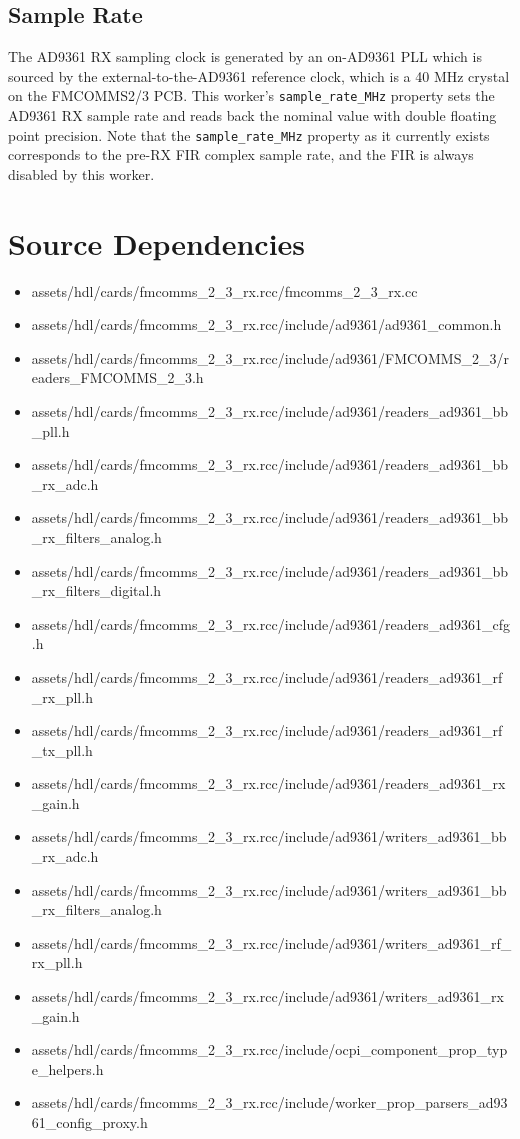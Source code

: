 \documentclass{article}
\begin{document}
\subsection*{Sample Rate}
The AD9361 RX sampling clock is generated by an on-AD9361 PLL which is sourced by the external-to-the-AD9361 reference clock, which is a 40 MHz crystal on the FMCOMMS2/3 PCB. This worker's \verb+sample_rate_MHz+ property sets the AD9361 RX sample rate and reads back the nominal value with double floating point precision. Note that the \verb+sample_rate_MHz+ property as it currently exists corresponds to the pre-RX FIR complex sample rate, and the FIR is always disabled by this worker.

\newpage

\section*{Source Dependencies}
\begin{itemize}
	\item assets/hdl/cards/fmcomms\_2\_3\_rx.rcc/fmcomms\_2\_3\_rx.cc
	\item assets/hdl/cards/fmcomms\_2\_3\_rx.rcc/include/ad9361/ad9361\_common.h
	\item assets/hdl/cards/fmcomms\_2\_3\_rx.rcc/include/ad9361/FMCOMMS\_2\_3/readers\_FMCOMMS\_2\_3.h
	\item assets/hdl/cards/fmcomms\_2\_3\_rx.rcc/include/ad9361/readers\_ad9361\_bb\_pll.h
	\item assets/hdl/cards/fmcomms\_2\_3\_rx.rcc/include/ad9361/readers\_ad9361\_bb\_rx\_adc.h
	\item assets/hdl/cards/fmcomms\_2\_3\_rx.rcc/include/ad9361/readers\_ad9361\_bb\_rx\_filters\_analog.h
	\item assets/hdl/cards/fmcomms\_2\_3\_rx.rcc/include/ad9361/readers\_ad9361\_bb\_rx\_filters\_digital.h
	\item assets/hdl/cards/fmcomms\_2\_3\_rx.rcc/include/ad9361/readers\_ad9361\_cfg.h
	\item assets/hdl/cards/fmcomms\_2\_3\_rx.rcc/include/ad9361/readers\_ad9361\_rf\_rx\_pll.h
	\item assets/hdl/cards/fmcomms\_2\_3\_rx.rcc/include/ad9361/readers\_ad9361\_rf\_tx\_pll.h
	\item assets/hdl/cards/fmcomms\_2\_3\_rx.rcc/include/ad9361/readers\_ad9361\_rx\_gain.h
	\item assets/hdl/cards/fmcomms\_2\_3\_rx.rcc/include/ad9361/writers\_ad9361\_bb\_rx\_adc.h
	\item assets/hdl/cards/fmcomms\_2\_3\_rx.rcc/include/ad9361/writers\_ad9361\_bb\_rx\_filters\_analog.h
	\item assets/hdl/cards/fmcomms\_2\_3\_rx.rcc/include/ad9361/writers\_ad9361\_rf\_rx\_pll.h
	\item assets/hdl/cards/fmcomms\_2\_3\_rx.rcc/include/ad9361/writers\_ad9361\_rx\_gain.h
	\item assets/hdl/cards/fmcomms\_2\_3\_rx.rcc/include/ocpi\_component\_prop\_type\_helpers.h
	\item assets/hdl/cards/fmcomms\_2\_3\_rx.rcc/include/worker\_prop\_parsers\_ad9361\_config\_proxy.h
\end{itemize}
\end{document}
